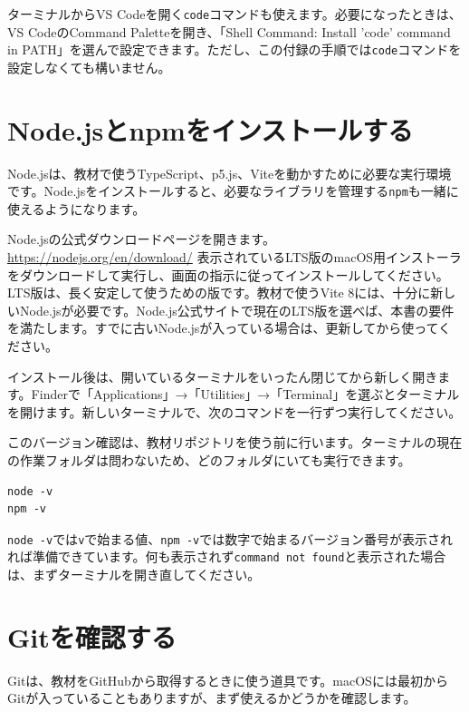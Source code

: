 ターミナルからVS Codeを開く\texttt{code}コマンドも使えます。必要になったときは、VS CodeのCommand Paletteを開き、「Shell Command: Install 'code' command in PATH」を選んで設定できます。ただし、この付録の手順では\texttt{code}コマンドを設定しなくても構いません。

\section{Node.jsとnpmをインストールする}

Node.jsは、教材で使うTypeScript、p5.js、Viteを動かすために必要な実行環境です。Node.jsをインストールすると、必要なライブラリを管理する\texttt{npm}も一緒に使えるようになります。

Node.jsの公式ダウンロードページを開きます。
\url{https://nodejs.org/en/download/}
表示されているLTS版のmacOS用インストーラをダウンロードして実行し、画面の指示に従ってインストールしてください。LTS版は、長く安定して使うための版です。教材で使うVite 8には、十分に新しいNode.jsが必要です。Node.js公式サイトで現在のLTS版を選べば、本書の要件を満たします。すでに古いNode.jsが入っている場合は、更新してから使ってください。

インストール後は、開いているターミナルをいったん閉じてから新しく開きます。Finderで「Applications」→「Utilities」→「Terminal」を選ぶとターミナルを開けます。新しいターミナルで、次のコマンドを一行ずつ実行してください。

このバージョン確認は、教材リポジトリを使う前に行います。ターミナルの現在の作業フォルダは問わないため、どのフォルダにいても実行できます。

\begin{listing}[htbp]
\begin{verbatim}
node -v
npm -v
\end{verbatim}
\caption{Node.jsとnpmのバージョンを確認するコマンド}
\label{lst:appendix-macos-check-node}
\end{listing}

\texttt{node -v}では\texttt{v}で始まる値、\texttt{npm -v}では数字で始まるバージョン番号が表示されれば準備できています。何も表示されず\texttt{command not found}と表示された場合は、まずターミナルを開き直してください。

\section{Gitを確認する}

Gitは、教材をGitHubから取得するときに使う道具です。macOSには最初からGitが入っていることもありますが、まず使えるかどうかを確認します。

